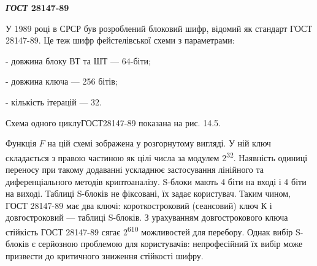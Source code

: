 {{{{{{{{{{{{{{{{{{\begin{definition}
{{{{{{{{{\bigskip


\bigskip

{\centering\bfseries
\textit{ГОСТ }28147-89
\par}


\bigskip

У 1989 році в СРСР був розроблений блоковий шифр, відомий як стандарт ГОСТ
28147-89. Це теж шифр фейстелівської схеми з параметрами:

 {}- довжина блоку ВТ та ШТ --- 64-біти; 

 {}-  довжина ключа --- 256 бітів;

 {}-  кількість ітерацій --- 32.

 Схема одного циклуГОСТ28147-89 показана на рис. 14.5. 

Функція  $F$ на цій схемі зображена  у розгорнутому вигляді. У ній ключ
складається з правою частиною як цілі числа за модулем 2\textsuperscript{32}.
Наявність одиниці переносу при такому додаванні ускладнює застосування
лінійного та диференціального методів криптоаналізу. S-блоки мають 4 біти на
вході і 4 біти на  виході. Таблиці S-блоків не фіксовані, їх задає користувач.
Таким чином, ГОСТ 28147-89 має два ключі: короткостроковий (сеансовий) ключ К і
довгостроковий --- таблиці S-блоків. З урахуванням довгострокового ключа
стійкість ГОСТ 28147-89 сягає  2\textsuperscript{610 } можливостей  для 
перебору.  Однак вибір S-блоків є серйозною проблемою для користувачів:
непрофесійний їх вибір може призвести до критичного зниження стійкості шифру.

}}}}}}}}}
\end{definition}}}}}}}}}}}}}}}}}}}
